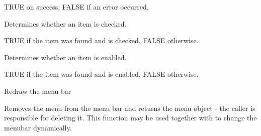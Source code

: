 




TRUE on success, FALSE if an error occurred.



\label{wxmenubarischecked}


Determines whether an item is checked.




TRUE if the item was found and is checked, FALSE otherwise.

\label{wxmenubarisenabled}


Determines whether an item is enabled.




TRUE if the item was found and is enabled, FALSE otherwise.

\label{wxmenubarrefresh}


Redraw the menu bar

\label{wxmenubarremove}


Removes the menu from the menu bar and returns the menu object - the caller is
responsible for deleting it. This function may be used together with 
 to change the menubar
dynamically.



